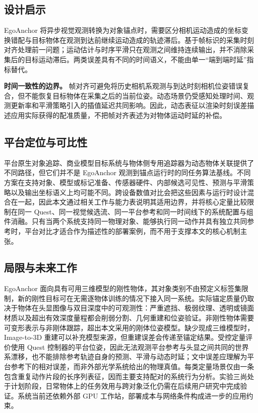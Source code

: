 \documentclass[9pt,twocolumn,letterpaper]{extarticle}
\begin{document}
\subsection{设计启示}


EgoAnchor 将异步视觉观测转换为对象锚点时，需要区分相机运动造成的坐标变换错配与目标物体在观测到达前继续运动造成的轨迹滞后。基于帧标识的采集时刻对齐处理前一问题；运动估计与时序平滑只在观测之间维持连续输出，并不消除采集后的目标运动滞后。两类误差具有不同的时间语义，不能由单一“端到端时延”指标替代。

\textbf{时间一致性的边界。} 帧对齐可避免将历史相机系观测与到达时刻相机位姿错误复合，但不能恢复目标物体在采集之后的当前位姿。动态场景仍受感知处理时间、观测更新率和平滑策略引入的插值延迟共同影响。因此，动态表征以渲染时刻误差描述应用实际获得的配准质量，不把帧对齐表述为对物体运动时延的补偿。

\subsection{平台定位与可比性}

平台原生对象追踪、商业模型目标系统与物体侧专用追踪器为动态物体关联提供了不同路径，但它们并不是 EgoAnchor 观测到锚点运行时的同任务算法基线。不同方案在支持对象、模型或标记准备、传感器硬件、内部候选可见性、预测与平滑策略以及输出坐标语义上均可能不同。跨设备数值对比会把这些因素与运行时设计混合在一起，因此本文通过相关工作与能力表说明其适用边界，并将核心定量比较限制在同一 Quest、同一视觉候选流、同一平台参考和同一时间线下的系统配置与组件消融。只有当两个系统支持同一物理对象、能够执行同一动作并具有独立共同参考时，平台对比才适合作为描述性的部署案例，而不用于支撑本文的核心机制主张。

\subsection{局限与未来工作}


EgoAnchor 面向具有可用三维模型的刚性物体，其对象类别不由预定义标签集限制，新的刚性目标可在无需逐物体训练的情况下接入同一系统。实际锚定质量仍取决于物体在头显图像与双目深度中的可观测性：严重遮挡、极弱纹理、透明或镜面材质以及超出有效深度量程都会削弱分割、几何重建和位姿验证。非刚性物体需要可变形表示与非刚体跟踪，超出本文采用的刚体位姿模型。缺少现成三维模型时，Image-to-3D 重建可以补充模型来源，但重建误差会传递至锚定结果。受控定量评价使用 Quest 控制器的平台位姿，因此无法观测平台参考与头显之间共同的世界系漂移，也不能排除参考轨迹自身的预测、平滑与动态时延；文中误差应理解为平台参考下的相对误差，而非外部光学系统给出的物理真值。每类定量场景仅由一条包含重复动作片段的长序列表征，因而主要支持配对的系统行为分析。实验三尚处于计划阶段，日常物体上的任务效用与跨对象泛化仍需在后续用户研究中完成验证。系统当前还依赖外部 GPU 工作站，部署成本与网络条件构成进一步的应用约束。
\end{document}
